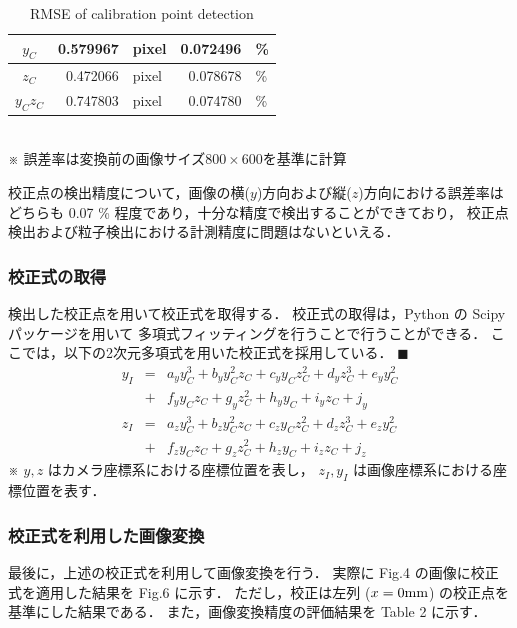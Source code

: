 \documentclass[twocolumn,a4j]{jsarticle}
\begin{document}
\begin{table}[hbtp]
  \centering
  \caption{RMSE of calibration point detection}
  \begin{tabular}{c r l r l}
    \hline
    $y_C$    & 0.579967 & pixel & 0.072496 & \% \\ \hline
    $z_C$    & 0.472066 & pixel & 0.078678 & \% \\ \hline
    $y_Cz_C$ & 0.747803 & pixel & 0.074780 & \% \\ \hline
  \end{tabular}\\
   \baselineskip
  ※ 誤差率は変換前の画像サイズ$800\times600$を基準に計算
\end{table}

校正点の検出精度について，画像の横($y$)方向および縦($z$)方向における誤差率は
どちらも 0.07 \% 程度であり，十分な精度で検出することができており，
校正点検出および粒子検出における計測精度に問題はないといえる．

\newpage
\subsubsection{校正式の取得}
検出した校正点を用いて校正式を取得する．
校正式の取得は，Python の Scipy パッケージを用いて
多項式フィッティングを行うことで行うことができる．
ここでは，以下の2次元多項式を用いた校正式を採用している．
 \baselineskip
\noindent $\blacksquare$ 
\begin{eqnarray*}
  y_I &=& a_y y_C^3 + b_y y_C^2 z_C + c_y y_C z_C^2 + d_y z_C^3 + e_y y_C^2\\
  &+& f_y y_C z_C + g_y z_C^2 + h_y y_C + i_y z_C + j_y\\
  z_I &=& a_z y_C^3 + b_z y_C^2 z_C + c_z y_C z_C^2 + d_z z_C^3 + e_z y_C^2\\
  &+& f_z y_C z_C + g_z z_C^2 + h_z y_C + i_z z_C + j_z
\end{eqnarray*}
※ $y, z$ はカメラ座標系における座標位置を表し，
$z_I, y_I$ は画像座標系における座標位置を表す．

 \baselineskip
\subsubsection{校正式を利用した画像変換}
最後に，上述の校正式を利用して画像変換を行う．
実際に Fig.4 の画像に校正式を適用した結果を Fig.6 に示す．
ただし，校正は左列 ($x = 0 \rm{mm}$) の校正点を基準にした結果である．
また，画像変換精度の評価結果を Table 2 に示す．
\end{document}
